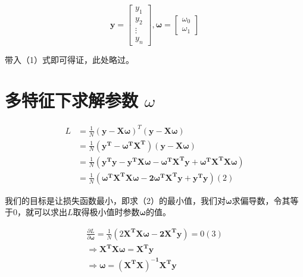\documentclass[a4paper,12pt]{book}
\begin{document}
    $$
    \boldsymbol{y}=\begin{bmatrix}
    y_1\\
    y_2\\
    \vdots\\
    y_n
    \end{bmatrix}, \boldsymbol{\omega}=\begin{bmatrix}
    \omega_0\\
    \omega_1
    \end{bmatrix}
    $$

    带入（1）式即可得证，此处略过。

    \section{多特征下求解参数 \textbf{${\omega}$}}

    $$
    \begin{aligned}
    L&=\frac{1}{N}(\boldsymbol{y}-\boldsymbol{X\omega})^T(\boldsymbol{y}-\boldsymbol{X\omega}) \\
    &=\frac{1}{N}(\boldsymbol{y^T-\omega^TX^T})(\boldsymbol{y}-\boldsymbol{X\omega})\\
    &=\frac{1}{N}(\boldsymbol{y^Ty-y^TX\omega-\omega^TX^Ty+\omega^TX^TX\omega})\\
    &=\frac{1}{N}(\boldsymbol{\omega^TX^TX\omega-2\omega^TX^Ty+y^Ty})(2)
    \end{aligned}
    $$

    我们的目标是让损失函数最小，即求（2）的最小值，我们对$\boldsymbol{\omega}$求偏导数，令其等于0，就可以求出$L$取得极小值时参数$\boldsymbol{\omega}$的值。
    
    \begin{equation}
        \begin{split}
        \label{E1}
            \frac{\partial{L}}{\partial{\boldsymbol{\omega}}}=\frac{1}{N}(2\boldsymbol{X^TX\omega-2X^Ty})=0(3)\\
            \Rightarrow  \boldsymbol{X^TX\omega=X^Ty}\\
            \Rightarrow  \boldsymbol{\omega=(X^TX)^{-1}X^Ty}
        \end{split}
    \end{equation}
   
\end{document}
